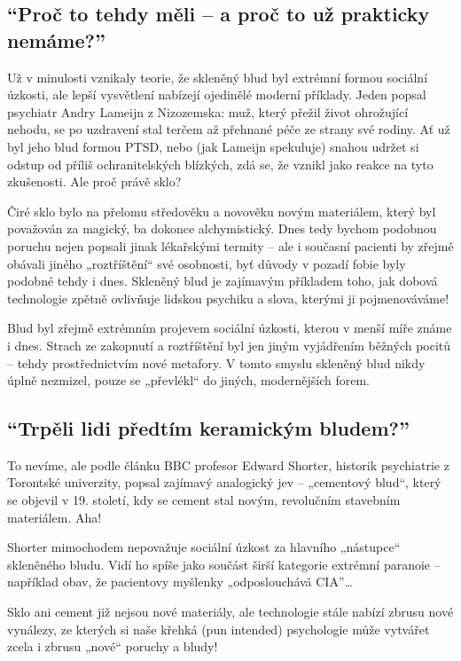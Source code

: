 \documentclass[main.tex]{subfiles}
\begin{document}
\subsection*{\enquote{Proč to tehdy měli – a proč to už prakticky nemáme?}}
Už v minulosti vznikaly teorie, že skleněný blud byl extrémní formou sociální úzkosti, ale lepší vysvětlení nabízejí ojedinělé moderní příklady. Jeden popsal psychiatr Andry Lameijn z Nizozemska: muž, který přežil život ohrožující nehodu, se po uzdravení stal terčem až přehnané péče ze strany své rodiny. Ať už byl jeho blud formou PTSD, nebo (jak Lameijn spekuluje) snahou udržet si odstup od příliš ochranitelských blízkých, zdá se, že vznikl jako reakce na tyto zkušenosti. Ale proč právě sklo?\par
Čiré sklo bylo na přelomu středověku a novověku novým materiálem, který byl považován za magický, ba dokonce alchymistický. Dnes tedy bychom podobnou poruchu nejen popsali jinak lékařskými termity – ale i současní pacienti by zřejmě obávali jiného „roztříštění“ své osobnosti, byť důvody v pozadí fobie byly podobné tehdy i dnes. Skleněný blud je zajímavým příkladem toho, jak dobová technologie zpětně ovlivňuje lidskou psychiku a slova, kterými ji pojmenováváme!\par
Blud byl zřejmě extrémním projevem sociální úzkosti, kterou v menší míře známe i dnes. Strach ze zakopnutí a roztříštění byl jen jiným vyjádřením běžných pocitů – tehdy prostřednictvím nové metafory. V tomto smyslu skleněný blud nikdy úplně nezmizel, pouze se „převlékl“ do jiných, modernějších forem.
\subsection*{\enquote{Trpěli lidi předtím keramickým bludem?}}
To nevíme, ale podle článku BBC profesor Edward Shorter, historik psychiatrie z Torontské univerzity, popsal zajímavý analogický jev – „cementový blud“, který se objevil v 19. století, kdy se cement stal novým, revolučním stavebním materiálem. Aha!\par
Shorter mimochodem nepovažuje sociální úzkost za hlavního „nástupce“ skleněného bludu. Vidí ho spíše jako součást širší kategorie extrémní paranoie – například obav, že pacientovy myšlenky „odposlouchává CIA”…\par
Sklo ani cement již nejsou nové materiály, ale technologie stále nabízí zbrusu nové vynálezy, ze kterých si naše křehká (pun intended) psychologie může vytvářet zcela i zbrusu „nové“ poruchy a bludy!
\newpage
\end{document}
